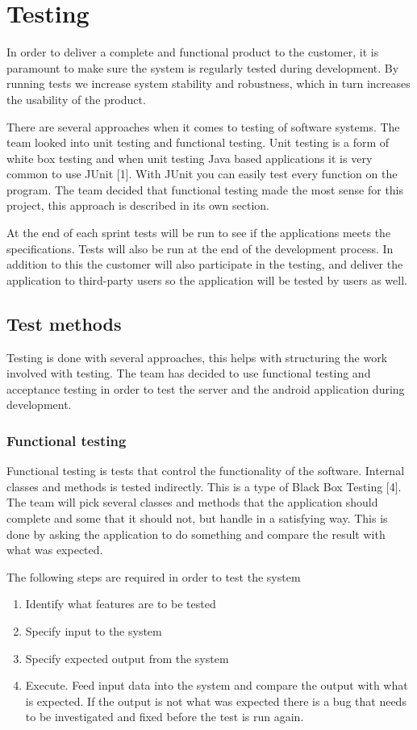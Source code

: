 \chapter{Testing}

In order to deliver a complete and functional product to the customer, it is paramount to make sure the system is regularly tested during development. By running tests we increase system stability and robustness, which in turn increases the usability of the product. 

There are several approaches when it comes to testing of software systems. The team looked into unit testing and functional testing. Unit testing is a form of white box testing and when unit testing Java based applications it is very common to use JUnit [1]. With JUnit you can easily test every function on the program. The team decided that functional testing made the most sense for this project, this approach is described in its own section.

At the end of each sprint tests will be run to see if the applications meets the specifications. Tests will also be run at the end of the development process. In addition to this the customer will also participate in the testing, and deliver the application to third-party users so the application will be tested by users as well.

\section{Test methods}
Testing is done with several approaches, this helps with structuring the work involved with testing. The team has decided to use functional testing and acceptance testing in order to test the server and the android application during development.

\subsection{Functional testing}
Functional testing is tests that control the functionality of the software. Internal classes and methods is tested indirectly. This is a type of Black Box Testing [4]. The team will pick several classes and methods that the application should complete and some that it should not, but handle in a satisfying way. This is done by asking the application to do something and compare the result with what was expected.

The following steps are required in order to test the system
\begin{enumerate}
\item Identify what features are to be tested
\item Specify input to the system
\item Specify expected output from the system
\item Execute. Feed input data into the system and compare the output with what is expected. If the output is not what was expected there is a bug that needs to be investigated and fixed before the test is run again.
\end{enumerate}

